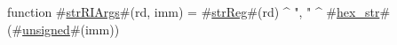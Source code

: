 function #\hyperref[zstrRIArgs]{strRIArgs}#(rd, imm) = #\hyperref[zstrReg]{strReg}#(rd) ^ ", " ^ #\hyperref[zhexzystr]{hex\_str}#(#\hyperref[zunsigned]{unsigned}#(imm))
